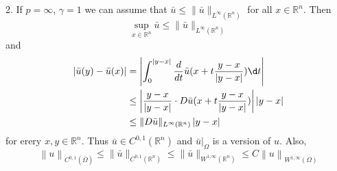 \begin{theorem}
    2. If $p=\infty$, $\gamma=1$ we can assume that $\bar{u}\leq \|\bar{u}\|_{L^\infty(\mathbb{R}^n)}$ for all $x\in \mathbb{R}^n$. Then
    $$\sup_{x\in \mathbb{R}^n}\bar{u} \leq \|\bar{u}\|_{L^\infty(\mathbb{R}^n)}$$
    and
    $$
        \begin{aligned}
            \left|\bar{u}(y)-\bar{u}(x)\right| &
            =\left|\int_0^{\left|y-x\right|} \frac{d}{dt}\bar{u}(x +t\frac{y-x}{\left|y-x\right|}) \d t\right|                                                     \\
                                               & \leq \left|\frac{y-x}{\left|y-x\right|} \cdot D\bar{u}(x +t\frac{y-x}{\left|y-x\right|}) \right| \left|y-x\right| \\
                                               & \leq \|D\bar{u}\|_{L^\infty(\mathbb{R}^n)} \left|y-x\right|
        \end{aligned}
    $$
    for erery $x,y\in \mathbb{R}^n$. Thus $\bar{u}\in C^{0,1}(\mathbb{R}^n)$ and $\bar{u}|_\Omega$ is a version of $u $. Also,
    $$
        \left\|u\right\|_{C^{0,1}(\bar{\Omega})}
        \leq
        \|\bar{u}\|_{C^{0,1}(\mathbb{R}^n)}
        \leq
        \|\bar{u}\|_{W^{1,\infty}(\mathbb{R}^n)}
        \leq
        C\left\|u\right\|_{W^{1,\infty}\left(\Omega\right)}$$
\end{theorem}



